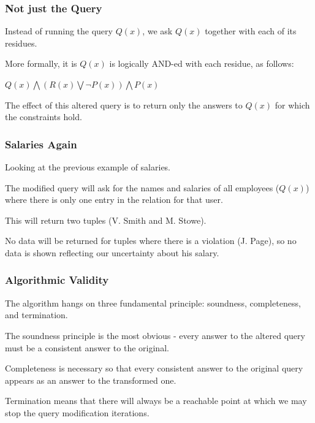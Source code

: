 \begin{frame}
\frametitle{Not just the Query}

Instead of running the query $Q(x)$, we ask $Q(x)$ together with each of its residues. 

More formally, it is $Q(x)$ is logically AND-ed with each residue, as follows:

\begin{center}
$Q(x) \bigwedge (R(x) \bigvee \neg P(x)) \bigwedge P(x)$
\end{center}

The effect of this altered query is to return only the answers to $Q(x)$ for which the constraints hold.

\end{frame}


\begin{frame}
\frametitle{Salaries Again}

Looking at the previous example of salaries.

The modified query will ask for the names and salaries of all employees ($Q(x)$) where there is only one entry in the relation for that user.

This will return two tuples (V. Smith and M. Stowe). 

No data will be returned for tuples where there is a violation (J. Page), so no data is shown reflecting our uncertainty about his salary.


\end{frame}

\begin{frame}
\frametitle{Algorithmic Validity}

The algorithm hangs on three fundamental principle: soundness, completeness, and termination.

The soundness principle is the most obvious - every answer to the altered query must be a consistent answer to the original.

Completeness is necessary so that every consistent answer to the original query appears as an answer to the transformed one. 

Termination means that there will always be a reachable point at which we may stop the query modification iterations.

\end{frame}



